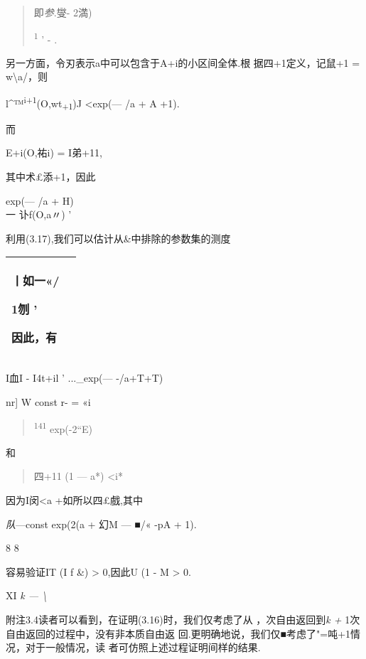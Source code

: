 \documentclass{article}
\begin{document}
\begin{quote}
即\emph{参}.{燮- 2満)}

\textsuperscript{1} ' - .
\end{quote}

另一方面，令刃表示a中可以包含于A+i的小区间全体.根 据四+1定义，记鼠+1 =
w\textbackslash{}a/，则

l\^{}™\textsuperscript{i+1}(O,wt\textsubscript{+1})J \textless{}exp(---
/a + A +1).

而

\textbar{}E+i(O,祐i)\textbar{} = I弟+11,

其中术£添+1，因此

{exp(--- /a + H)\\
}一\textbar{} 讣f(O,a〃)\textbar{} '

利用(3.17),我们可以估计从\&中排除的参数集的测度

\begin{longtable}[]{@{}ll@{}}
\toprule
\endhead
\begin{minipage}[t]{0.47\columnwidth}\raggedright
{丨如一\textbar{}«/ \textbar{}}

1刎 '

因此，有\strut
\end{minipage} & \begin{minipage}[t]{0.47\columnwidth}\raggedright
\strut
\end{minipage}\tabularnewline
\bottomrule
\end{longtable}

I血I - I4t+il ' ...\_exp(--- -/a+T+T)

nr{]} W const r- = «i

\begin{quote}
\textsuperscript{141} exp(-2``E)
\end{quote}

和

\begin{quote}
\textbar{}四+11 (1 --- a*) \textbar{}\textless{}i*
\end{quote}

因为I闵\textless{}a +如所以四£戲,其中

\emph{队}---const exp(2(a + 幻M --- ■/« -pA + 1).

8 8

容易验证IT (I f \&) \textgreater{} 0,因此U (1 - M \textgreater{} 0.

XI \emph{k --- \textbackslash{}}

附注3.4读者可以看到，在证明(3.16)时，我们仅考虑了从
，次自由返回到\emph{k +} 1次自由返回的过程中，没有非本质自由返
回.更明确地说，我们仅■考虑了"=吨+1情况，对于一般情况，读
者可仿照上述过程证明间样的结果.
\end{document}
